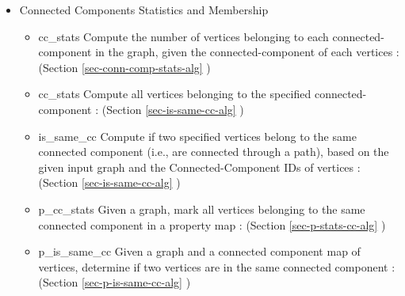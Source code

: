 \begin{itemize}
\item
Connected Components Statistics and Membership
\begin{itemize}
\item
cc\_stats 
\newline
Compute the number of vertices belonging to each connected-component in the graph, given the connected-component of each vertices
 : (Section \ref{sec-conn-comp-stats-alg} )
\item
cc\_stats 
\newline
Compute all vertices belonging to the specified connected-component
 : (Section \ref{sec-is-same-cc-alg} )
\item
is\_same\_cc 
\newline
Compute if two specified vertices belong to the same connected component (i.e., are connected through a path), based on the given input graph and the Connected-Component IDs of vertices
 : (Section \ref{sec-is-same-cc-alg} )
\item
p\_cc\_stats 
\newline
Given a graph, mark all vertices belonging to the same connected component in a property map
 : (Section \ref{sec-p-stats-cc-alg} )
\item
p\_is\_same\_cc 
\newline
Given a graph and a connected component map of vertices, determine if two vertices are in the same connected component
 : (Section \ref{sec-p-is-same-cc-alg} )
\end{itemize}


\end{itemize}
